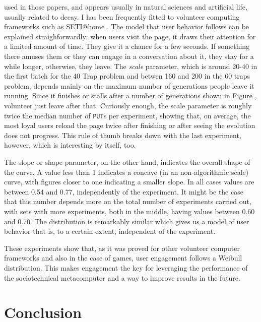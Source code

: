 \documentclass[letterpaper]{article}
\begin{document}
used in those papers, and appears usually in natural sciences and
artificial life, usually related to decay. I has been frequently
fitted to volunteer computing frameworks such as SETI@home
\citep{javadi2009mining}. The model that user behavior follows can be
explained straighforwardly: when users visit the page, it draws their
attention for a limited amount of time. They give it a chance for a
few seconds. If something there amuses them or they can engage in a
conversation about it, they stay for a while longer, otherwise, they
leave. The {\em scale} parameter, which is around 20-40 in the first
batch for the 40 Trap problem and betwen 160 and 200 in the 60 traps
problem, depends mainly on the maximum number of generations people
leave it running. Since it finishes or stalls after a number of
generations shown in Figure \cite{tab:summary:os}, volunteer just
leave after that. Curiously enough, the scale parameter is roughly
twice the median number of {\tt PUT}s per experiment, showing that, on
average, the most loyal users reload the page twice after finishing or
after seeing the evolution does not progress. This rule of thumb
breaks down with the last experiment, however, which is interesting by
itself, too. 

The slope or shape parameter, on the other hand, indicates the overall
shape of the curve. A value less than 1 indicates a concave (in an
non-algorithmic scale) curve,
with figures closer to one indicating a smaller slope. In all cases
values are between 0.54 and 0.77, independently of the experiment. It
might be the case that this number depends more on the total number of
experiments carried out, with sets with more experiments, both in the
middle, having values between 0.60 and 0.70. The distribution is
remarkably similar which gives us a model of user behavior that is, to
a certain extent, independent of the experiment.  

These experiments show that, as it was proved for other volunteer
computer frameworks and also in the case of games, user engagement
follows a Weibull distribution. This makes engagement the key for
leveraging the performance of the sociotechnical metacomputer and a
way to improve results in the future. 

\section{Conclusion}
\label{sec:conclusion}
\end{document}
